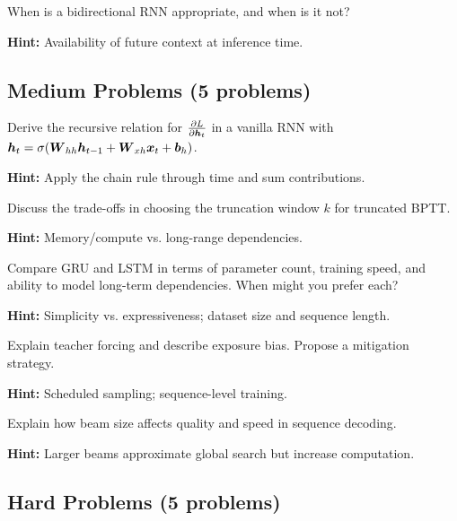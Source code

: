 \begin{problem}[Bidirectionality]
When is a bidirectional RNN appropriate, and when is it not?

\textbf{Hint:} Availability of future context at inference time.
\end{problem}

\subsection{Medium Problems (5 problems)}

\begin{problem}
Derive the recursive relation for $\frac{\partial L}{\partial \boldsymbol{h}_t}$ in a vanilla RNN with $\boldsymbol{h}_t = \sigma(\boldsymbol{W}_{hh}\boldsymbol{h}_{t-1}+\boldsymbol{W}_{xh}\boldsymbol{x}_t+\boldsymbol{b}_h)$.

\textbf{Hint:} Apply the chain rule through time and sum contributions.
\end{problem}

\begin{problem}
Discuss the trade-offs in choosing the truncation window $k$ for truncated BPTT.

\textbf{Hint:} Memory/compute vs. long-range dependencies.
\end{problem}

\begin{problem}
Compare GRU and LSTM in terms of parameter count, training speed, and ability to model long-term dependencies. When might you prefer each?

\textbf{Hint:} Simplicity vs. expressiveness; dataset size and sequence length.
\end{problem}

\begin{problem}
Explain teacher forcing and describe exposure bias. Propose a mitigation strategy.

\textbf{Hint:} Scheduled sampling; sequence-level training.
\end{problem}

\begin{problem}
Explain how beam size affects quality and speed in sequence decoding.

\textbf{Hint:} Larger beams approximate global search but increase computation.
\end{problem}

\subsection{Hard Problems (5 problems)}

